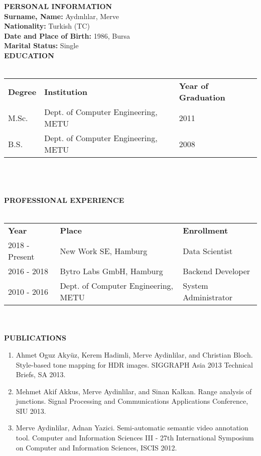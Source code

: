 \begin{curriculumvitae}
\textbf{PERSONAL INFORMATION}\\


\textbf{Surname, Name: } Aydınlılar, Merve \\
\textbf{Nationality: } Turkish (TC) \\
\textbf{Date and Place of Birth: } 1986, Bursa\\
\textbf{Marital Status: } Single \\

\textbf{EDUCATION} \\
\\
\begin{tabular}{l l l}
    \textbf{Degree} & \textbf{Institution} & \textbf{Year of Graduation}  \\
    M.Sc.  &  Dept. of Computer Engineering, METU & 2011 \\
    B.S. & Dept. of Computer Engineering, METU & 2008 \\
\end{tabular}\\ 
\\
\\
\textbf{PROFESSIONAL EXPERIENCE} \\
\\
\begin{tabular}{l l l}
    \textbf{Year} & \textbf{Place} & \textbf{Enrollment}  \\
    2018 - Present & New Work SE, Hamburg & Data Scientist \\
    2016 - 2018 & Bytro Labs GmbH, Hamburg & Backend Developer \\
    2010 - 2016 & Dept. of Computer Engineering, METU & System Administrator\\
\end{tabular}\\
\\

\textbf{PUBLICATIONS} 
\begin{enumerate}
    \item Ahmet Oguz Akyüz, Kerem Hadimli, Merve Aydinlilar, and Christian Bloch. Style-based tone mapping for HDR images. SIGGRAPH Asia 2013 Technical Briefs, SA 2013.  
    \item Mehmet Akif Akkus, Merve Aydinlilar, and Sinan Kalkan. Range analysis of junctions. Signal Processing and Communications Applications Conference, SIU 2013.
    \item Merve Aydinlilar, Adnan Yazici. Semi-automatic semantic video annotation tool. Computer and Information Sciences III - 27th International Symposium on Computer and Information Sciences, ISCIS 2012.
\end{enumerate}

\end{curriculumvitae}